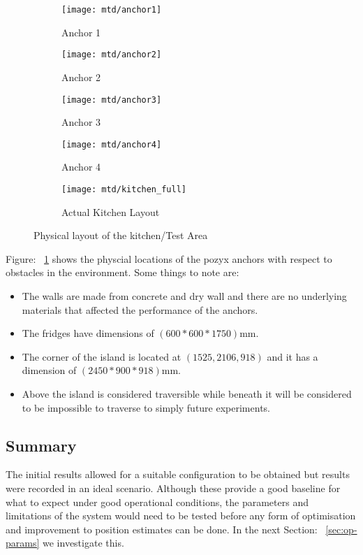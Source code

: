 \begin{figure}[h!]
    \centering
    \begin{subfigure}[b]{0.4\textwidth}
            \texttt{[image: mtd/anchor1]}
            \caption{Anchor 1}
    \end{subfigure}
    \begin{subfigure}[b]{0.4\textwidth}
            \texttt{[image: mtd/anchor2]}
            \caption{Anchor 2}
    \end{subfigure}

    \begin{subfigure}[b]{0.4\textwidth}
            \texttt{[image: mtd/anchor3]}
            \caption{Anchor 3}
    \end{subfigure}
    \begin{subfigure}[b]{0.4\textwidth}
            \texttt{[image: mtd/anchor4]}
            \caption{Anchor 4}
    \end{subfigure}

    \begin{subfigure}[b]{0.7\textwidth}
            \texttt{[image: mtd/kitchen\_full]}
            \caption{Actual Kitchen Layout}
    \end{subfigure}
    \caption{Physical layout of the kitchen/Test Area}
    \label{fig:kitchen}
\end{figure}
\medskip
Figure: ~\ref{fig:kitchen} shows the physcial locations of the pozyx anchors with respect to obstacles in the environment.
Some things to note are:
\begin{itemize}
    \item The walls are made from concrete and dry wall and there are no underlying materials that affected the performance of the anchors.
    \item The fridges have dimensions of $(600*600*1750)$mm.
    \item The corner of the island is located at $(1525,2106,918)$ and it has a dimension of $(2450*900*918)$mm.
    \item Above the island is considered traversible while beneath it will be considered to be impossible to traverse to simply future experiments.
\end{itemize}

\subsection*{Summary}
The initial results allowed for a suitable configuration to be obtained but results were recorded in an ideal scenario.
Although these provide a good baseline for what to expect under good operational conditions, the parameters and limitations of the system would need to be tested before any form of optimisation
and improvement to position estimates can be done.
In the next Section: ~\ref{sec:op-params} we investigate this.

\newpage

\newpage
